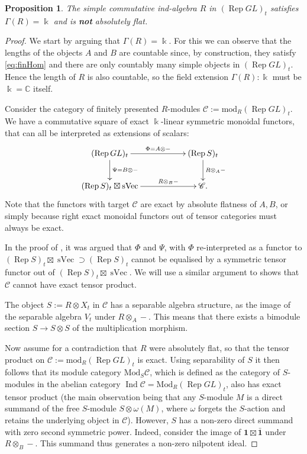 \documentclass[11pt]{amsart}
\def\Ind{\operatorname{Ind}}
\def\cC{\mathscr{C}}
\def\bk{\Bbbk}
\def\mod{\mathrm{ mod}}
\def\Rep{\operatorname{Rep}}
\def\sVec{\operatorname{sVec}}
\def\Mod{\mathrm{Mod}}
\newtheorem{prop}[thm]{Proposition}
\theoremstyle{definition}
\theoremstyle{remark}
\numberwithin{equation}{section}
\newcommand{\unit}{\mathbf{1}}
\begin{document}
\begin{prop}\label{lem:counter}
    The simple commutative ind-algebra $R$ in $(\Rep GL)_t$ satisfies $\Gamma(R)=\bk$ and is {\bf not} absolutely flat.
\end{prop}
\begin{proof}
We start by arguing that $\Gamma(R)=\bk$. For this we can observe that the lengths of the objects $A$ and $B$ are countable since, by construction, they satisfy \eqref{eq:finHom} and there are only countably many simple objects in $(\Rep GL)_t$. Hence the length of $R$ is also countable, so the field extension $\Gamma(R):\bk$ must be $\bk=\mathbb{C}$ itself.


Consider the category of finitely presented $R$-modules $\cC:=\mod_{R}(\Rep GL)_t$. We have a commutative square of exact $\bk$-linear symmetric monoidal functors, that can all be interpreted as extensions of scalars:
    $$\xymatrix{
(\Rep GL)_t\ar[rr]^-{\Phi=A\otimes-}\ar[d]^-{\Psi=B\otimes-}&& (\Rep S)_t\ar[d]^-{R\otimes_A-}\\
(\Rep S)_t\boxtimes\sVec\ar[rr]^-{R\otimes_B-}&&\cC.
    }$$
Note that the functors with target $\cC$ are exact by absolute flatness of $A,B$, or simply because right exact monoidal functors out of tensor categories must always be exact.


In the proof of \cite[Proposition~5.1.1]{CEO}, it was argued that $\Phi$ and $\Psi$, with $\Phi$ re-interpreted as a functor to $(\Rep S)_t\boxtimes\sVec\supset (\Rep S)_t$ cannot be equalised by a symmetric tensor functor out of $(\Rep S)_t\boxtimes\sVec$. We will use a similar argument to shows that $\cC$ cannot have exact tensor product.

The object $S:=R\otimes X_t$ in $\cC$ has a separable algebra structure, as the image of the separable algebra $V_t$ under $R\otimes_A-$. This means that there exists a bimodule section $S\to S\otimes S$ of the multiplication morphism.


Now assume for a contradiction that $R$ were absolutely flat, so that the tensor product on $\cC:=\mod_{R}(\Rep GL)_t$ is exact.
Using separability of $S$ it then follows that its module category $\Mod_S\cC$, which is defined as the category of $S$-modules in the abelian category $\Ind\cC=\Mod_{R}(\Rep GL)_t$, also has exact tensor product (the main observation being that any $S$-module $M$ is a direct summand of the free $S$-module $S\otimes \omega(M)$, where $\omega$ forgets the $S$-action and retains the underlying object in $\cC$). However, $S$ has a non-zero direct summand with zero second symmetric power. Indeed, consider the image of $ \unit\boxtimes\bar{\unit}$ under $R\otimes_B-$. This summand thus generates a non-zero nilpotent ideal.
    

\end{proof}
\end{document}
